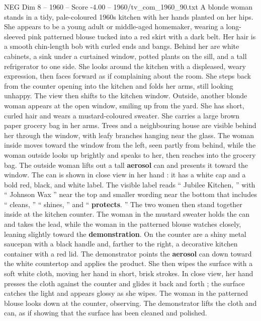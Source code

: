 \begin{textsample}{NEG Dim 8 – 1960 – Score -4.00 – 1960/tv\_com\_1960\_90.txt}  \label{ex:f8_neg_002}
A blonde woman stands in a tidy, pale-coloured 1960s kitchen with her hands planted on her hips.
She appears to be a young adult or middle-aged homemaker, wearing a long-sleeved pink patterned blouse tucked into a red skirt with a dark belt.
Her hair is a smooth chin-length bob with curled ends and bangs.
Behind her are white cabinets, a sink under a curtained window, potted plants on the sill, and a tall refrigerator to one side.
She looks around the kitchen with a displeased, weary expression, then faces forward as if complaining about the room.
She steps back from the counter opening into the kitchen and folds her arms, still looking unhappy.
The view then shifts to the kitchen window.
Outside, another blonde woman appears at the open window, smiling up from the yard.
She has short, curled hair and wears a mustard-coloured sweater.
She carries a large brown paper grocery bag in her arms.
Trees and a neighbouring house are visible behind her through the window, with leafy branches hanging near the glass.
The woman inside moves toward the window from the left, seen partly from behind, while the woman outside looks up brightly and speaks to her, then reaches into the grocery bag.
The outside woman lifts out a tall \textbf{aerosol} can and presents it toward the window.
The can is shown in close view in her hand : it has a white cap and a bold red, black, and white label.
The visible label reads “ Jubilee Kitchen, ” with “ Johnson Wax ” near the top and smaller wording near the bottom that includes “ cleans, ” “ shines, ” and “ \textbf{protects}. ” The two women then stand together inside at the kitchen counter.
The woman in the mustard sweater holds the can and takes the lead, while the woman in the patterned blouse watches closely, leaning slightly toward the \textbf{demonstration}.
On the counter are a shiny metal saucepan with a black handle and, farther to the right, a decorative kitchen container with a red lid.
The demonstrator points the \textbf{aerosol} can down toward the white countertop and applies the product.
She then wipes the surface with a soft white cloth, moving her hand in short, brisk strokes.
In close view, her hand presses the cloth against the counter and glides it back and forth ; the surface catches the light and appears glossy as she wipes.
The woman in the patterned blouse looks down at the counter, observing.
The demonstrator lifts the cloth and can, as if showing that the surface has been cleaned and polished.

\end{textsample}
